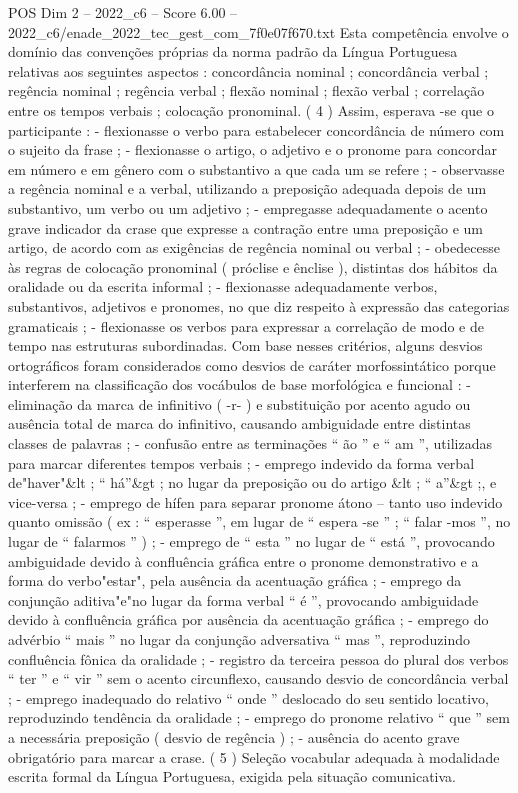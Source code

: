 \begin{textsample}{POS Dim 2 – 2022\_c6 – Score 6.00 – 2022\_c6/enade\_2022\_tec\_gest\_com\_7f0e07f670.txt}
Esta competência envolve o domínio das convenções próprias da norma padrão da Língua Portuguesa relativas aos seguintes aspectos : concordância nominal ; concordância verbal ; regência nominal ; regência verbal ; flexão nominal ; flexão verbal ; correlação entre os tempos verbais ; colocação pronominal. ( 4 ) Assim, esperava -se que o participante : - flexionasse o verbo para estabelecer concordância de número com o sujeito da frase ; - flexionasse o artigo, o adjetivo e o pronome para concordar em número e em gênero com o substantivo a que cada um se refere ; - observasse a regência nominal e a verbal, utilizando a preposição adequada depois de um substantivo, um verbo ou um adjetivo ; - empregasse adequadamente o acento grave indicador da crase que expresse a contração entre uma preposição e um artigo, de acordo com as exigências de regência nominal ou verbal ; - obedecesse às regras de colocação pronominal ( próclise e ênclise ), distintas dos hábitos da oralidade ou da escrita informal ; - flexionasse adequadamente verbos, substantivos, adjetivos e pronomes, no que diz respeito à expressão das categorias gramaticais ; - flexionasse os verbos para expressar a correlação de modo e de tempo nas estruturas subordinadas.
Com base nesses critérios, alguns desvios ortográficos foram considerados como desvios de caráter morfossintático porque interferem na classificação dos vocábulos de base morfológica e funcional : - eliminação da marca de infinitivo ( -r- ) e substituição por acento agudo ou ausência total de marca do infinitivo, causando ambiguidade entre distintas classes de palavras ; - confusão entre as terminações “ ão ” e “ am ”, utilizadas para marcar diferentes tempos verbais ; - emprego indevido da forma verbal de"haver"\&lt ; “ há”\&gt ; no lugar da preposição ou do artigo \&lt ; “ a”\&gt ;, e vice-versa ; - emprego de hífen para separar pronome átono – tanto uso indevido quanto omissão ( ex : “ esperasse ”, em lugar de “ espera -se ” ; “ falar -mos ”, no lugar de “ falarmos ” ) ; - emprego de “ esta ” no lugar de “ está ”, provocando ambiguidade devido à confluência gráfica entre o pronome demonstrativo e a forma do verbo"estar", pela ausência da acentuação gráfica ; - emprego da conjunção aditiva"e"no lugar da forma verbal “ é ”, provocando ambiguidade devido à confluência gráfica por ausência da acentuação gráfica ; - emprego do advérbio “ mais ” no lugar da conjunção adversativa “ mas ”, reproduzindo confluência fônica da oralidade ; - registro da terceira pessoa do plural dos verbos “ ter ” e “ vir ” sem o acento circunflexo, causando desvio de concordância verbal ; - emprego inadequado do relativo “ onde ” deslocado do seu sentido locativo, reproduzindo tendência da oralidade ; - emprego do pronome relativo “ que ” sem a necessária preposição ( desvio de regência ) ; - ausência do acento grave obrigatório para marcar a crase. ( 5 ) Seleção vocabular adequada à modalidade escrita formal da Língua Portuguesa, exigida pela situação comunicativa.

\end{textsample}
